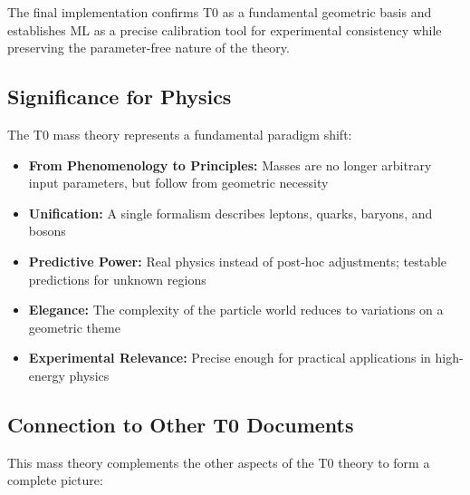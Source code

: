 	The final implementation confirms T0 as a fundamental geometric basis and establishes ML as a precise calibration tool for experimental consistency while preserving the parameter-free nature of the theory.
	
	\subsection{Significance for Physics}
	
	The T0 mass theory represents a fundamental paradigm shift:
	
	\begin{itemize}
		\item \textbf{From Phenomenology to Principles:} Masses are no longer arbitrary input parameters, but follow from geometric necessity
		
		\item \textbf{Unification:} A single formalism describes leptons, quarks, baryons, and bosons
		
		\item \textbf{Predictive Power:} Real physics instead of post-hoc adjustments; testable predictions for unknown regions
		
		\item \textbf{Elegance:} The complexity of the particle world reduces to variations on a geometric theme
		
		\item \textbf{Experimental Relevance:} Precise enough for practical applications in high-energy physics
	\end{itemize}
	
	\subsection{Connection to Other T0 Documents}
	
	This mass theory complements the other aspects of the T0 theory to form a complete picture:
	
	\begin{table}[h]
		\centering
		\small
		\caption{Integration of the mass theory into the overall T0 theory}
		\label{tab:integration}
	\end{table}
	
